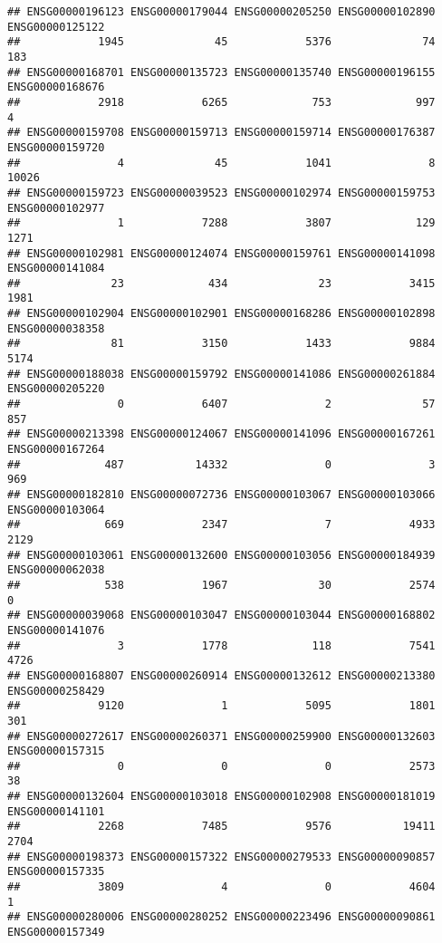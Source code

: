 \documentclass[
]{article}
\begin{document}
\begin{verbatim}
## ENSG00000196123 ENSG00000179044 ENSG00000205250 ENSG00000102890 ENSG00000125122 
##            1945              45            5376              74             183 
## ENSG00000168701 ENSG00000135723 ENSG00000135740 ENSG00000196155 ENSG00000168676 
##            2918            6265             753             997               4 
## ENSG00000159708 ENSG00000159713 ENSG00000159714 ENSG00000176387 ENSG00000159720 
##               4              45            1041               8           10026 
## ENSG00000159723 ENSG00000039523 ENSG00000102974 ENSG00000159753 ENSG00000102977 
##               1            7288            3807             129            1271 
## ENSG00000102981 ENSG00000124074 ENSG00000159761 ENSG00000141098 ENSG00000141084 
##              23             434              23            3415            1981 
## ENSG00000102904 ENSG00000102901 ENSG00000168286 ENSG00000102898 ENSG00000038358 
##              81            3150            1433            9884            5174 
## ENSG00000188038 ENSG00000159792 ENSG00000141086 ENSG00000261884 ENSG00000205220 
##               0            6407               2              57             857 
## ENSG00000213398 ENSG00000124067 ENSG00000141096 ENSG00000167261 ENSG00000167264 
##             487           14332               0               3             969 
## ENSG00000182810 ENSG00000072736 ENSG00000103067 ENSG00000103066 ENSG00000103064 
##             669            2347               7            4933            2129 
## ENSG00000103061 ENSG00000132600 ENSG00000103056 ENSG00000184939 ENSG00000062038 
##             538            1967              30            2574               0 
## ENSG00000039068 ENSG00000103047 ENSG00000103044 ENSG00000168802 ENSG00000141076 
##               3            1778             118            7541            4726 
## ENSG00000168807 ENSG00000260914 ENSG00000132612 ENSG00000213380 ENSG00000258429 
##            9120               1            5095            1801             301 
## ENSG00000272617 ENSG00000260371 ENSG00000259900 ENSG00000132603 ENSG00000157315 
##               0               0               0            2573              38 
## ENSG00000132604 ENSG00000103018 ENSG00000102908 ENSG00000181019 ENSG00000141101 
##            2268            7485            9576           19411            2704 
## ENSG00000198373 ENSG00000157322 ENSG00000279533 ENSG00000090857 ENSG00000157335 
##            3809               4               0            4604               1 
## ENSG00000280006 ENSG00000280252 ENSG00000223496 ENSG00000090861 ENSG00000157349 

\end{verbatim}
\end{document}
